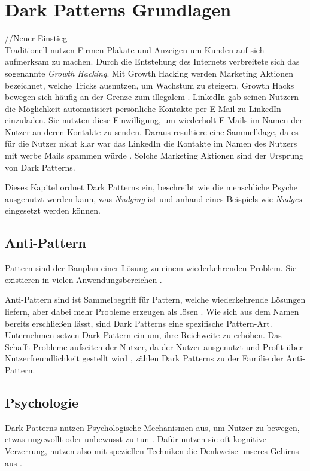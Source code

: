 \documentclass[conference,compsoc,final,a4paper]{IEEEtran}
\begin{document}
\section{Dark Patterns Grundlagen}
//Neuer Einstieg\\

Traditionell nutzen Firmen Plakate und Anzeigen um Kunden auf sich aufmerksam zu machen. Durch die Entstehung des Internets verbreitete sich das sogenannte \textit{Growth Hacking}. Mit Growth Hacking werden Marketing Aktionen bezeichnet, welche Tricks ausnutzen, um Wachstum zu steigern. Growth Hacks bewegen sich häufig an der Grenze zum illegalem  \autocite{Narayanan2020}. LinkedIn gab seinen Nutzern die Möglichkeit automatisiert persönliche Kontakte per E-Mail zu LinkedIn einzuladen. Sie nutzten diese Einwilligung, um wiederholt E-Mails im Namen der Nutzer an deren Kontakte zu senden. Daraus resultiere eine Sammelklage, da es für die Nutzer nicht klar war das LinkedIn die Kontakte im Namen des Nutzers mit werbe Mails spammen würde \autocite{Strange2015}. Solche Marketing Aktionen sind der Ursprung von Dark Patterns.

Dieses Kapitel ordnet Dark Patterns ein, beschreibt wie die menschliche Psyche ausgenutzt werden kann, was \textit{Nudging} ist und anhand eines Beispiels wie \textit{Nudges} eingesetzt werden können.
\subsection{Anti-Pattern}
Pattern sind der Bauplan einer Lösung zu einem wiederkehrenden Problem. Sie existieren in vielen Anwendungsbereichen \autocite[S. 1]{MacDonald2019}.

Anti-Pattern sind ist Sammelbegriff für Pattern, welche wiederkehrende Lösungen liefern, aber dabei mehr Probleme erzeugen als lösen \autocite[S. 193-195]{MacDonald2019}. Wie sich aus dem Namen bereits erschließen lässt, sind Dark Patterns eine spezifische Pattern-Art.
Unternehmen setzen Dark Pattern ein um, ihre Reichweite zu erhöhen. Das Schafft Probleme aufseiten der Nutzer, da der Nutzer ausgenutzt und Profit über Nutzerfreundlichkeit gestellt wird \autocite{Chivukula_2019}, zählen Dark Patterns zu der Familie der Anti-Pattern.
\subsection{Psychologie}
\label{chap:Psychologie}
Dark Patterns nutzen Psychologische Mechanismen aus, um Nutzer zu bewegen, etwas ungewollt oder unbewusst zu tun \autocite{Brignull}. Dafür nutzen sie oft kognitive Verzerrung, nutzen also mit speziellen Techniken die Denkweise unseres Gehirns aus \autocite{Mathur2019}.
\end{document}
